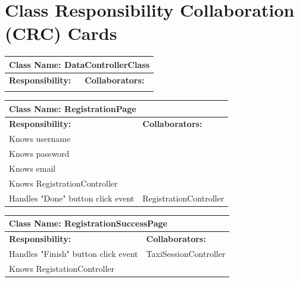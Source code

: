 \documentclass[]{article}
\begin{document}
	
\section{Class Responsibility Collaboration (CRC) Cards}
\label{sec:class_responsibility_collaboration_crc_cards}

	\begin{table}[H]
	\centering
	\begin{tabular}{|p{6cm}|p{6cm}|}
	\hline 
		\multicolumn{2}{|l|}{\textbf{Class Name: DataControllerClass}} \\
	\hline
	\textbf{Responsibility:} & \textbf{Collaborators:} \\
	\hline 
	&\\ \hline 
	\end{tabular}
	\end{table}
	
	\begin{table}[H]
	\centering
	\begin{tabular}{|p{6cm}|p{6cm}|}
	\hline 
		\multicolumn{2}{|l|}{\textbf{Class Name: RegistrationPage}} \\
	\hline
	\textbf{Responsibility:} & \textbf{Collaborators:} \\
	\hline 
	Knows username &\\ \hline 
	Knows password &\\ \hline
	Knows email &\\ \hline
	Knows RegistrationController &\\ \hline
	Handles "Done" button click event  & RegistrationController\\ \hline
	\end{tabular}
	\end{table}
	
	\begin{table}[H]
	\centering
	\begin{tabular}{|p{6cm}|p{6cm}|}
	\hline 
		\multicolumn{2}{|l|}{\textbf{Class Name: RegistrationSuccessPage}} \\
	\hline
	\textbf{Responsibility:} & \textbf{Collaborators:} \\
	\hline 
	Handles "Finish" button click event  & TaxiSessionController\\ \hline 
	Knows RegistationController &\\ \hline
	\end{tabular}
	\end{table}
	
\end{document}
